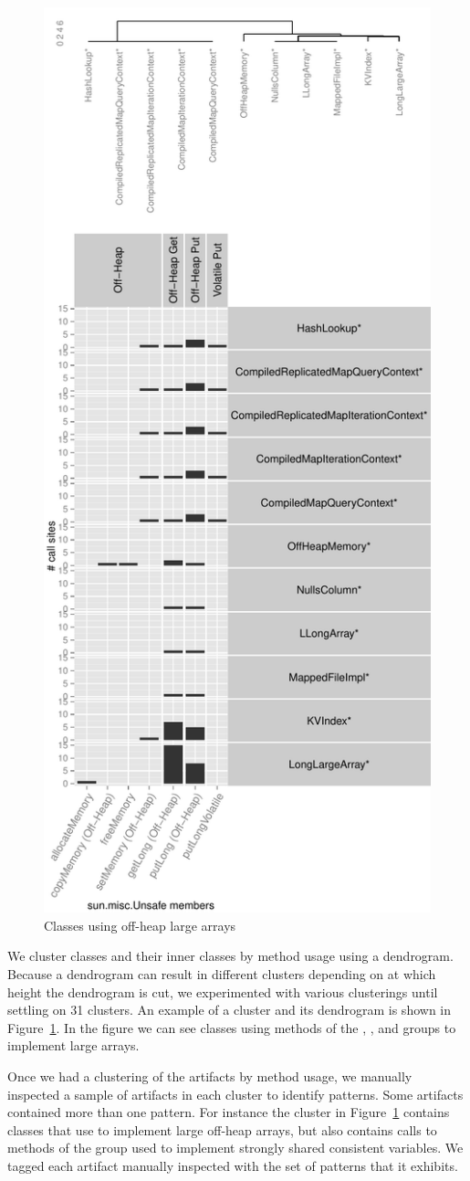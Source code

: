 \begin{figure}[!ht]
\includegraphics[width=0.55\columnwidth]{chapters/unsafe/classunit}
\caption{Classes using off-heap large arrays}
\label{fig:classunitfingerprint}
\end{figure}

We cluster classes and their inner classes by \unsafe{} method usage using a dendrogram.
Because a dendrogram can result in different clusters depending on at which height the dendrogram is cut,
we experimented with various clusterings until settling on 31 clusters.
An example of a cluster and its dendrogram is shown in Figure~\ref{fig:classunitfingerprint}.
In the figure we can see classes using methods of the , , and  groups to implement large arrays.

Once we had a clustering of the artifacts by method usage, we manually
inspected a sample of artifacts in each cluster to identify patterns.
Some artifacts contained more than one pattern.
For instance the cluster in Figure~\ref{fig:classunitfingerprint} contains
classes that use \unsafe{} to implement large off-heap arrays, but also
contains
calls to methods of the  group used to implement
strongly shared consistent variables.
We tagged each artifact manually inspected with the set of patterns that it exhibits.